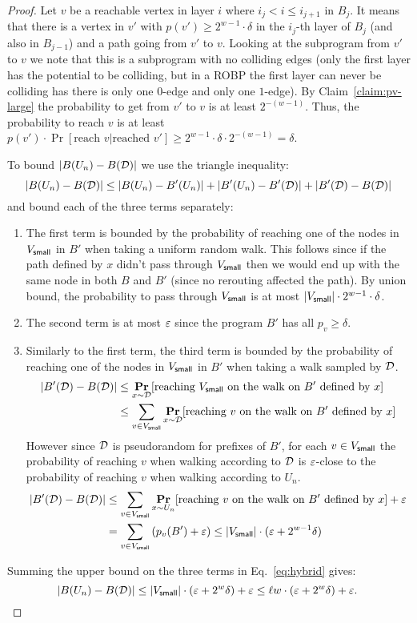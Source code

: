 \begin{proof}
Let $v$ be a reachable vertex in layer $i$ where $i_j < i \le i_{j+1}$ in $B_j$. It means that there is a vertex in $v'$ with $p(v') \ge 2^{w-1}\cdot \delta$ in the $i_{j}$-th layer of $B_j$ (and also in $B_{j-1}$) and a path going from $v'$ to $v$. 
Looking at the subprogram from $v'$ to $v$ we note that this is a subprogram with no colliding edges (only the first layer has the potential to be colliding, but in a ROBP the first layer can never be colliding has there is only one $0$-edge and only one $1$-edge). By Claim~\ref{claim:pv-large} the probability to get from $v'$ to $v$ is at least $2^{-(w-1)}$.
Thus, the probability to reach $v$ is at least $p(v') \cdot \Pr[\text{reach $v$}|\text{reached $v'$}] \ge 2^{w-1} \cdot \delta \cdot 2^{-(w-1)} = \delta$.

To bound $|B(U_n)-B({\mathcal{D}})|$ we use the triangle inequality:
\begin{equation}\label{eq:hybrid}|B(U_n)-B({\mathcal{D}})|  \le |B(U_n)-B'(U_n)| + |B'(U_n)-B'({\mathcal{D}})| + |B'({\mathcal{D}})-B({\mathcal{D}})|\end{equation}
and bound each of the three terms separately:
\begin{enumerate}
\item	
The first term is bounded by the probability of reaching one of the nodes in $V_{\mathsf{small}}$ in $B'$ when taking a uniform random walk. This follows since if the path defined by $x$ didn't pass through $V_{\mathsf{small}}$ then we would end up with the same node in both $B$ and $B'$ (since no rerouting affected the path).
By union bound, the probability to pass through $V_{\mathsf{small}}$ is at most $|V_{\mathsf{small}}| \cdot 2^{w-1} \cdot \delta$.
\item The second term is at most $\varepsilon$ since the program $B'$ has all $p_v \ge \delta$.
\item Similarly to the first term, the third term is bounded by the probability of reaching one of the nodes in $V_{\mathsf{small}}$ in $B'$ when taking a walk sampled by ${\mathcal{D}}$.
	\begin{align*}
		|B'({\mathcal{D}}) - B({\mathcal{D}})|
		&\le \mathop{\bf Pr\/}_{x\sim {\mathcal{D}}}[\text{reaching $V_{\mathsf{small}}$ on the walk on $B'$ defined by $x$}] \\
		&\le \sum_{v\in V_{\mathsf{small}}} \mathop{\bf Pr\/}_{x\sim {\mathcal{D}}}[\text{reaching $v$ on the walk on $B'$ defined by $x$}]
	\end{align*}
	However since ${\mathcal{D}}$ is pseudorandom for prefixes of $B'$, for each $v \in V_{\mathsf{small}}$ the probability of reaching $v$ when walking according to ${\mathcal{D}}$ is  $\varepsilon$-close to the probability of reaching $v$ when walking according to $U_n$.
	\begin{align*}
		|B'({\mathcal{D}}) - B({\mathcal{D}})|
		&\le \sum_{v\in V_{\mathsf{small}}} \mathop{\bf Pr\/}_{x\sim U_n}[\text{reaching $v$ on the walk on $B'$ defined by $x$}] + \varepsilon\\
		&= \sum_{v\in V_{\mathsf{small}}} \left(p_v(B') + \varepsilon\right)
		\le |V_{\mathsf{small}}| \cdot (\varepsilon + 2^{w-1} \delta)
	\end{align*}
\end{enumerate}

Summing the upper bound on the three terms in Eq.~\eqref{eq:hybrid} gives:
\[|B(U_n)-B({\mathcal{D}})| \le |V_{\mathsf{small}}|\cdot (\varepsilon +  2^{w} \delta) + \varepsilon  \le \ell w \cdot (\varepsilon +  2^{w} \delta) + \varepsilon.\;\qedhere\]
\end{proof}


